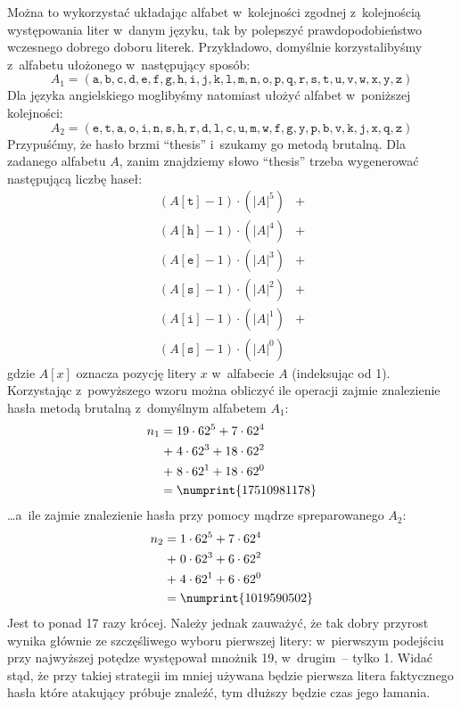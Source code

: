 Można to wykorzystać układając alfabet w~kolejności zgodnej z~kolejnością
występowania liter w~danym języku, tak by polepszyć prawdopodobieństwo
wczesnego dobrego doboru literek. Przykładowo, domyślnie korzystalibyśmy
z~alfabetu ułożonego w~następujący sposób:
    $$A_1 = (
    \mathtt{a}, \mathtt{b}, \mathtt{c}, \mathtt{d}, \mathtt{e}, \mathtt{f},
    \mathtt{g}, \mathtt{h}, \mathtt{i}, \mathtt{j}, \mathtt{k}, \mathtt{l},
    \mathtt{m}, \mathtt{n}, \mathtt{o}, \mathtt{p}, \mathtt{q}, \mathtt{r},
    \mathtt{s}, \mathtt{t}, \mathtt{u}, \mathtt{v}, \mathtt{w}, \mathtt{x},
    \mathtt{y}, \mathtt{z})$$
Dla języka angielskiego moglibyśmy natomiast ułożyć alfabet w~poniższej
kolejności:
    $$A_2 = (
    \mathtt{e}, \mathtt{t}, \mathtt{a}, \mathtt{o}, \mathtt{i}, \mathtt{n},
    \mathtt{s}, \mathtt{h}, \mathtt{r}, \mathtt{d}, \mathtt{l}, \mathtt{c},
    \mathtt{u}, \mathtt{m}, \mathtt{w}, \mathtt{f}, \mathtt{g}, \mathtt{y},
    \mathtt{p}, \mathtt{b}, \mathtt{v}, \mathtt{k}, \mathtt{j}, \mathtt{x},
    \mathtt{q}, \mathtt{z})$$
\newpage
Przypuśćmy, że hasło brzmi ``thesis'' i~szukamy go metodą brutalną.
Dla zadanego alfabetu $A$, zanim znajdziemy słowo ``thesis'' trzeba wygenerować
następującą liczbę haseł:
    \[
        \begin{aligned}
        (A[\mathtt{t}]-1)\cdot(|A|^5) &+\\
        (A[\mathtt{h}]-1)\cdot(|A|^4) &+\\
        (A[\mathtt{e}]-1)\cdot(|A|^3) &+\\
        (A[\mathtt{s}]-1)\cdot(|A|^2) &+\\
        (A[\mathtt{i}]-1)\cdot(|A|^1) &+\\
        (A[\mathtt{s}]-1)\cdot(|A|^0)
        \end{aligned}
    \]
gdzie $A[x]$ oznacza pozycję litery $x$ w~alfabecie $A$ (indeksując od 1).
Korzystając z~powyższego wzoru można obliczyć ile operacji zajmie znalezienie
hasła metodą brutalną z~domyślnym alfabetem $A_1$:
    \[
        \begin{aligned}
        n_1=\;&19 \cdot 62^5 + 7 \cdot 62^4 \\
        +\;&4 \cdot 62^3 + 18 \cdot 62^2 \\
        +\;&8 \cdot 62^1 + 18 \cdot 62^0 \\
        =\;&\numprint{17510981178}
        \end{aligned}
    \]
\ldots a~ile zajmie znalezienie hasła przy pomocy mądrze spreparowanego
$A_2$:
    \[
        \begin{aligned}
        n_2=\;&1 \cdot 62^5 + 7 \cdot 62^4 \\
        +\;&0 \cdot 62^3 + 6 \cdot 62^2 \\
        +\;&4 \cdot 62^1 + 6 \cdot 62^0 \\
        =\;&\numprint{1019590502}
        \end{aligned}
    \]
Jest to ponad 17 razy krócej. Należy jednak zauważyć, że tak dobry przyrost
wynika głównie ze szczęśliwego wyboru pierwszej litery: w~pierwszym podejściu
przy najwyższej potędze występował mnożnik 19, w~drugim~-- tylko 1. Widać stąd,
że przy takiej strategii im mniej używana będzie pierwsza litera faktycznego
hasła które atakujący próbuje znaleźć, tym dłuższy będzie czas jego łamania.

